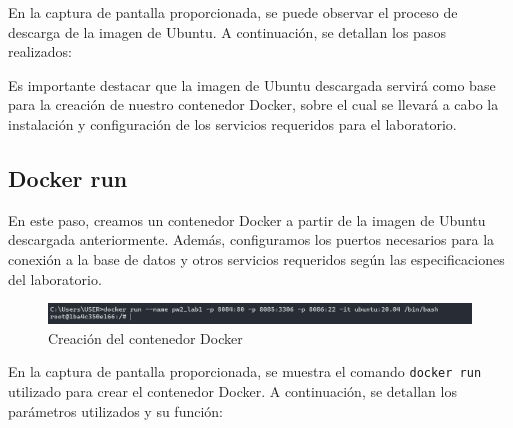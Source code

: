 \documentclass{article}
\begin{document}
En la captura de pantalla proporcionada, se puede observar el proceso de descarga de la imagen de Ubuntu. A continuación, se detallan los pasos realizados:




Es importante destacar que la imagen de Ubuntu descargada servirá como base para la creación de nuestro contenedor Docker, sobre el cual se llevará a cabo la instalación y configuración de los servicios requeridos para el laboratorio.


\subsection{Docker run}

En este paso, creamos un contenedor Docker a partir de la imagen de Ubuntu descargada anteriormente. Además, configuramos los puertos necesarios para la conexión a la base de datos y otros servicios requeridos según las especificaciones del laboratorio.

\begin{figure}[h]
    \centering
    \includegraphics[width=1\textwidth]{latex/img/docker_run.png}
    \caption{Creación del contenedor Docker}
    \label{fig:docker_run}
\end{figure}

En la captura de pantalla proporcionada, se muestra el comando \texttt{docker run} utilizado para crear el contenedor Docker. A continuación, se detallan los parámetros utilizados y su función:
\end{document}
